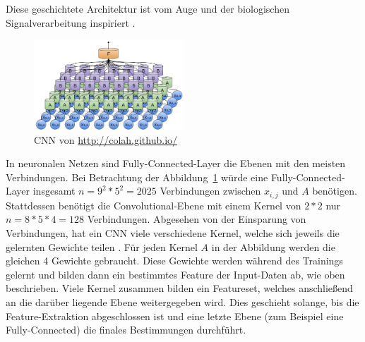 \documentclass[pdftex,a4paper,halfparskip, article]{scrartcl}
\begin{document}
Diese geschichtete Architektur ist vom Auge und der biologischen Signalverarbeitung inspiriert \cite{Hubel68}.

\begin{figure}[h]
\centering
\includegraphics[width=0.5\textwidth]{colah_cnn}
\caption{CNN von \url{http://colah.github.io/}}
\label{fig:colah-cnn}
\end{figure}


In neuronalen Netzen sind Fully-Connected-Layer die Ebenen mit den meisten Verbindungen. Bei Betrachtung der Abbildung~\ref{fig:colah-cnn} würde eine Fully-Connected-Layer insgesamt $ n = 9^2 * 5^2 = 2025$ Verbindungen zwischen $x_{i, j}$ und $A$ benötigen. Stattdessen benötigt die Convolutional-Ebene mit einem Kernel von $2*2$ nur $n = 8 * 5 *4 = 128$ Verbindungen. Abgesehen von der Einsparung von Verbindungen, hat ein CNN viele verschiedene Kernel, welche sich jeweils die gelernten Gewichte teilen \cite{colahsBlogCnn}. Für jeden Kernel $A$ in der Abbildung werden die gleichen 4 Gewichte gebraucht. Diese Gewichte werden während des Trainings gelernt und bilden dann ein bestimmtes Feature der Input-Daten ab, wie oben beschrieben. Viele Kernel zusammen bilden ein Featureset, welches anschließend an die darüber liegende Ebene weitergegeben wird. Dies geschieht solange, bis die Feature-Extraktion abgeschlossen ist und eine letzte Ebene (zum Beispiel eine Fully-Connected) die finales Bestimmungen durchführt.
\end{document}

